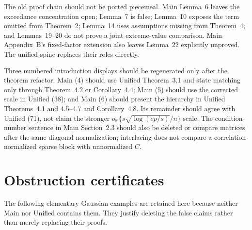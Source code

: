 \documentclass[a4paper,10pt,english]{article}
\theoremstyle{definition}
\newcommand{\Prob}{\mathbb P}
\begin{document}
The old proof chain should not be ported piecemeal.  Main Lemma~6 leaves
the exceedance concentration open; Lemma~7 is false; Lemma~10 exposes
the term omitted from Theorem~2; Lemma~14 uses assumptions missing from
Theorem~4; and Lemmas~19--20 do not prove a joint extreme-value
comparison.  Main Appendix~B's fixed-factor extension also leaves Lemma~22
explicitly unproved.  The unified spine replaces their roles directly.

Three numbered introduction displays should be regenerated only after
the theorem refactor.  Main (4) should use Unified Theorem~3.1 and state
matching only through Theorem~4.2 or Corollary~4.4; Main (5) should use
the corrected scale in Unified (38); and Main (6) should present
the hierarchy in Unified Theorems~4.1 and 4.5--4.7 and Corollary~4.8.  Its
remainder should agree with Unified (71), not claim the stronger
$o_{\Prob}\{s\sqrt{\log(ep/s)}/n\}$ scale.  The condition-number
sentence in Main Section~2.3 should also be deleted or compare matrices
after the same diagonal normalization; interlacing does not compare a
correlation-normalized sparse block with unnormalized $C$.

\appendix
\section{Obstruction certificates}

The following elementary Gaussian examples are retained here because
neither Main nor Unified contains them.  They justify deleting the false
claims rather than merely replacing their proofs.
\end{document}
